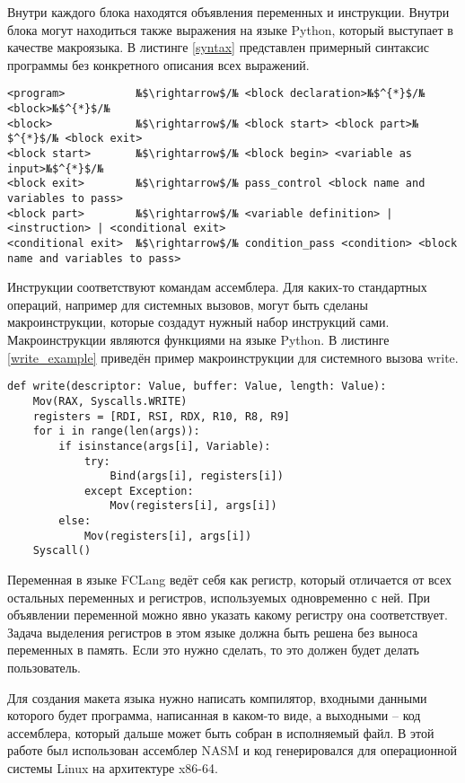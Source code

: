 \documentclass[a4paper,14pt]{extarticle}
\begin{document}
Внутри каждого блока находятся объявления переменных и инструкции.
Внутри блока могут находиться также выражения на языке Python, который выступает в качестве макроязыка.
В листинге \ref{syntax} представлен примерный синтаксис программы без конкретного описания всех выражений.

\begin{lstlisting}[caption=Синтаксис программы на FCLang, label=syntax]
<program>           №$\rightarrow$/№ <block declaration>№$^{*}$/№ <block>№$^{*}$/№
<block>             №$\rightarrow$/№ <block start> <block part>№$^{*}$/№ <block exit>
<block start>       №$\rightarrow$/№ <block begin> <variable as input>№$^{*}$/№
<block exit>        №$\rightarrow$/№ pass_control <block name and variables to pass>
<block part>        №$\rightarrow$/№ <variable definition> | <instruction> | <conditional exit>
<conditional exit>  №$\rightarrow$/№ condition_pass <condition> <block name and variables to pass>
\end{lstlisting}

Инструкции соответствуют командам ассемблера.
Для каких-то стандартных операций, например для системных вызовов, могут быть сделаны макроинструкции, которые создадут нужный набор инструкций сами.
Макроинструкции являются функциями на языке Python.
В листинге \ref{write_example} приведён пример макроинструкции для системного вызова write.

\begin{lstlisting}[caption=Пример макроинструкции для системного вызова write, label=write_example]
def write(descriptor: Value, buffer: Value, length: Value):
    Mov(RAX, Syscalls.WRITE)
    registers = [RDI, RSI, RDX, R10, R8, R9]
    for i in range(len(args)):
        if isinstance(args[i], Variable):
            try:
                Bind(args[i], registers[i])
            except Exception:
                Mov(registers[i], args[i])
        else:
            Mov(registers[i], args[i])
    Syscall()
\end{lstlisting}

Переменная в языке FCLang ведёт себя как регистр, который отличается от всех остальных переменных и регистров, используемых одновременно с ней.
При объявлении переменной можно явно указать какому регистру она соответствует.
Задача выделения регистров в этом языке должна быть решена без выноса переменных в память.
Если это нужно сделать, то это должен будет делать пользователь.

Для создания макета языка нужно написать компилятор, входными данными которого будет программа, написанная в каком-то виде,
а выходными -- код ассемблера, который дальше может быть собран в исполняемый файл.
В этой работе был использован ассемблер NASM и код генерировался для операционной системы Linux на архитектуре x86-64.
\end{document}
